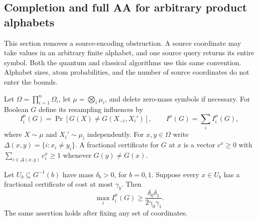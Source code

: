 \subsection{Completion and full AA for arbitrary product alphabets}
\label{sec:resolution-product-alphabets}

This section removes a source-encoding obstruction. A source coordinate
may take values in an arbitrary finite alphabet, and one source query
returns its entire symbol. Both the quantum and classical algorithms
use this same convention. Alphabet sizes, atom probabilities, and the
number of source coordinates do not enter the bounds.

Let \(\Omega=\prod_{i=1}^n\Omega_i\), let
\(\mu=\bigotimes_i\mu_i\), and delete zero-mass symbols if necessary.
For Boolean \(G\) define its resampling influences by
\[
 I_i^\mu(G)=\Pr[G(X)\ne G(X_{-i},X_i')],
 \qquad I^\mu(G)=\sum_i I_i^\mu(G),
\]
where \(X\sim\mu\) and \(X_i'\sim\mu_i\) independently.
For \(x,y\in\Omega\) write
\(\Delta(x,y)=\{i:x_i\ne y_i\}\).
A fractional certificate for \(G\) at \(x\) is a vector
\(c^x\ge0\) with
\(\sum_{i\in\Delta(x,y)}c_i^x\ge1\) whenever \(G(y)\ne G(x)\).

\begin{lemma}
\label{lem:resolution-alphabet-certificates}
Let \(U_b\subseteq G^{-1}(b)\) have mass \(\delta_b>0\), for
\(b=0,1\). Suppose every \(x\in U_b\) has a fractional certificate
of cost at most \(\gamma_b\). Then
\[
 \max_i I_i^\mu(G)\ge\frac{\delta_0\delta_1}{2\gamma_0\gamma_1}.
 \tag{AC}
\]
The same assertion holds after fixing any set of coordinates.
\end{lemma}

